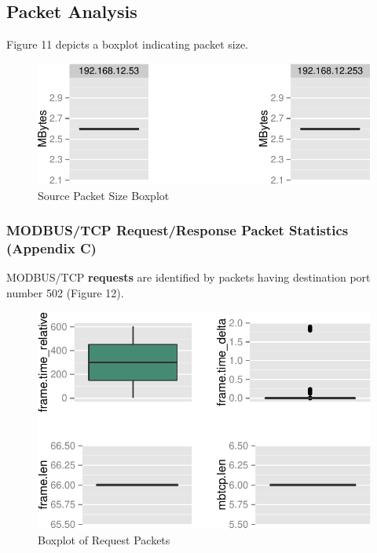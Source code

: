 \documentclass[11pt,]{article}
\begin{document}
\subsection{Packet Analysis}\label{packet-analysis}

Figure 11 depicts a boxplot indicating packet size.

\begin{figure}[h]

{\centering \includegraphics{thesis_files/figure-latex/unnamed-chunk-21-1} 

}

\caption{Source Packet Size Boxplot}\label{fig:unnamed-chunk-21}
\end{figure}

\subsubsection{MODBUS/TCP Request/Response Packet Statistics (Appendix
C)}\label{modbustcp-requestresponse-packet-statistics-appendix-c}

MODBUS/TCP \textbf{requests} are identified by packets having
destination port number 502 (Figure 12).

\begin{figure}[h]

{\centering \includegraphics{thesis_files/figure-latex/unnamed-chunk-22-1} 

}

\caption{Boxplot of Request Packets}\label{fig:unnamed-chunk-22}
\end{figure}
\end{document}
